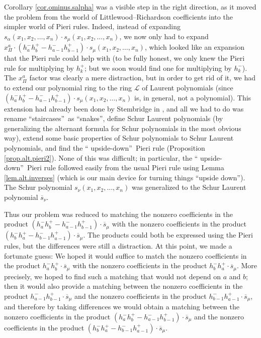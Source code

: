 \documentclass[numbers=enddot,12pt,final,onecolumn,notitlepage]{scrartcl}%
\theoremstyle{definition}
\begin{document}
Corollary \ref{cor.ominus.salpha} was a visible step in the right direction,
as it moved the problem from the world of Littlewood--Richardson coefficients
into the simpler world of Pieri rules. Indeed, instead of expanding
$s_{\alpha}\left(  x_{1},x_{2},\ldots,x_{n}\right)  \cdot s_{\mu}\left(
x_{1},x_{2},\ldots,x_{n}\right)  $, we now only had to expand $x_{\Pi}%
^{a}\cdot\left(  h_{a}^{-}h_{b}^{+}-h_{a-1}^{-}h_{b-1}^{+}\right)  \cdot
s_{\mu}\left(  x_{1},x_{2},\ldots,x_{n}\right)  $, which looked like an
expansion that the Pieri rule could help with (to be fully honest, we only
knew the Pieri rule for multiplying by $h_{k}^{+}$; but we soon would find one
for multiplying by $h_{k}^{-}$). The $x_{\Pi}^{a}$ factor was clearly a mere
distraction, but in order to get rid of it, we had to extend our polynomial
ring to the ring $\mathcal{L}$ of Laurent polynomials (since $\left(
h_{a}^{-}h_{b}^{+}-h_{a-1}^{-}h_{b-1}^{+}\right)  \cdot s_{\mu}\left(
x_{1},x_{2},\ldots,x_{n}\right)  $ is, in general, not a polynomial). This
extension had already been done by Stembridge in \cite{Stembr87}, and all we
had to do was rename \textquotedblleft staircases\textquotedblright\ as
\textquotedblleft snakes\textquotedblright, define Schur Laurent polynomials
(by generalizing the alternant formula for Schur polynomials in the most
obvious way), extend some basic properties of Schur polynomials to Schur
Laurent polynomials, and find the \textquotedblleft
upside-down\textquotedblright\ Pieri rule (Proposition \ref{prop.alt.pieri2}).
None of this was difficult; in particular, the \textquotedblleft
upside-down\textquotedblright\ Pieri rule followed easily from the usual Pieri
rule using Lemma \ref{lem.alt.inverses} (which is our main device for turning
things \textquotedblleft upside down\textquotedblright). The Schur polynomial
$s_{\nu}\left(  x_{1},x_{2},\ldots,x_{n}\right)  $ was generalized to the
Schur Laurent polynomial $\overline{s}_{\nu}$.

Thus our problem was reduced to matching the nonzero coefficients in the
product $\left(  h_{a}^{-}h_{b}^{+}-h_{a-1}^{-}h_{b-1}^{+}\right)
\cdot\overline{s}_{\mu}$ with the nonzero coefficients in the product $\left(
h_{b}^{-}h_{a}^{+}-h_{b-1}^{-}h_{a-1}^{+}\right)  \cdot\overline{s}_{\mu}$.
The products could both be expressed using the Pieri rules, but the
differences were still a distraction. At this point, we made a fortunate
guess: We hoped it would suffice to match the nonzero coefficients in the
product $h_{a}^{-}h_{b}^{+}\cdot\overline{s}_{\mu}$ with the nonzero
coefficients in the product $h_{b}^{-}h_{a}^{+}\cdot\overline{s}_{\mu}$. More
precisely, we hoped to find such a matching that would not depend on $a$ and
$b$; then it would also provide a matching between the nonzero coefficients in
the product $h_{a-1}^{-}h_{b-1}^{+}\cdot\overline{s}_{\mu}$ and the nonzero
coefficients in the product $h_{b-1}^{-}h_{a-1}^{+}\cdot\overline{s}_{\mu}$,
and therefore by taking differences we would obtain a matching between the
nonzero coefficients in the product $\left(  h_{a}^{-}h_{b}^{+}-h_{a-1}%
^{-}h_{b-1}^{+}\right)  \cdot\overline{s}_{\mu}$ and the nonzero coefficients
in the product $\left(  h_{b}^{-}h_{a}^{+}-h_{b-1}^{-}h_{a-1}^{+}\right)
\cdot\overline{s}_{\mu}$.
\end{document}
